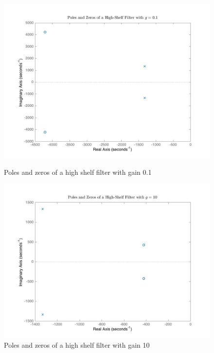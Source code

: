 \documentclass{article}
\begin{document}
\begin{figure}[!htb]
    \centering
    \begin{minipage}{.5\textwidth}
        \centering
        \includegraphics[width=1.0\linewidth, height=0.2\textheight]{highshelfpoles.jpg}
        \caption{Poles and zeros of a high shelf filter with gain 0.1}
    \end{minipage}
        \begin{minipage}{.5\textwidth}
        \centering
        \includegraphics[width=1.0\linewidth, height=0.2\textheight]{highshelfpoles10.jpg}
        \caption{Poles and zeros of a high shelf filter with gain 10}
    \end{minipage}
    \end{figure}
    
\end{document}
